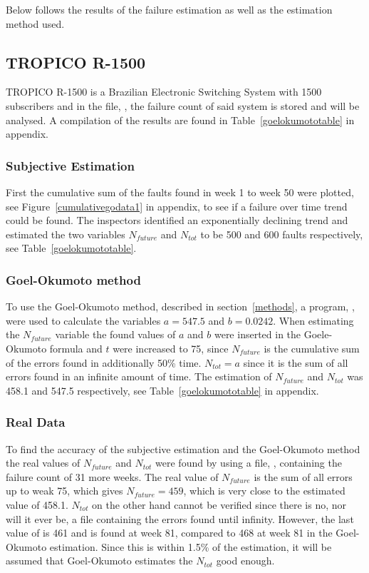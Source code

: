 Below follows the results of the failure estimation as well as the estimation method used.

\subsection{TROPICO R-1500}
TROPICO R-1500 is a Brazilian Electronic Switching System with 1500 subscribers and in the file, , the failure count of said system is stored and will be analysed. A compilation of the results are found in Table~\ref{goelokumototable} in appendix.
\subsubsection*{Subjective Estimation} 
First the cumulative sum of the faults found in week 1 to week 50 were plotted, see Figure~\ref{cumulativegodata1} in appendix, to see if a failure over time trend could be found.
The inspectors identified an exponentially declining trend and estimated the two variables $N_{future}$ and $N_{tot}$ to be 500 and 600 faults respectively, see Table~\ref{goelokumototable}. 
\subsubsection*{Goel-Okumoto method}
To use the Goel-Okumoto method, described in section~\ref{methods}, a program, , were used to calculate the variables $a=547.5$ and $b=0.0242$.
When estimating the $N_{future}$ variable the found values of $a$ and $b$ were inserted in the Goele-Okumoto formula and $t$ were increased to 75, since $N_{future}$ is the cumulative sum of the errors found in additionally 50\% time. 
$N_{tot} = a$ since it is the sum of all errors found in an infinite amount of time.
The estimation of $N_{future}$ and $N_{tot}$ was 458.1 and 547.5 respectively, see Table~\ref{goelokumototable} in appendix.
\subsubsection*{Real Data}
To find the accuracy of the subjective estimation and the Goel-Okumoto method the real values of $N_{future}$ and $N_{tot}$ were found by using a file, , containing the failure count of 31 more weeks. 
The real value of $N_{future}$ is the sum of all errors up to weak 75, which gives $N_{future}=459$, which is very close to the estimated value of 458.1. $N_{tot}$ on the other hand cannot be verified since there is no, nor will it ever be, a file containing the errors found until infinity. However, the last value of  is 461 and is found at week 81, compared to 468 at week 81 in the Goel-Okumoto estimation. Since this is within 1.5\% of the estimation, it will be assumed that Goel-Okumoto estimates the $N_{tot}$ good enough.



